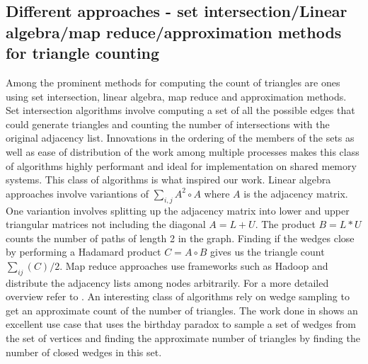 \subsection{Different approaches - set intersection/Linear algebra/map reduce/approximation methods for triangle counting}
Among the prominent methods for computing the count of triangles are ones using set intersection, linear algebra, map reduce and approximation methods. Set intersection algorithms \cite{b7} involve computing a set of all the possible edges that could generate triangles and counting the number of intersections with the original adjacency list. Innovations in the ordering of the members of the sets as well as ease of distribution of the work among multiple processes makes this class of algorithms highly performant\cite{b8} and ideal for implementation on shared memory systems. This class of algorithms is what inspired our work. Linear algebra approaches involve variantions of $\sum_{i,j}A^2\circ A$ where $A$ is the adjacency matrix\cite{b6}. One variantion involves splitting up the adjacency matrix into lower and upper triangular matrices not including the diagonal $A = L + U$. The product $B = L*U$ counts the number of paths of length 2 in the graph. Finding if the wedges close by performing a Hadamard product $C= A\circ B$ gives us the triangle count $\sum_{ij}(C)/2$\cite{b10, b9}. Map reduce approaches use frameworks such as Hadoop and distribute the adjacency lists among nodes arbitrarily. For a more detailed overview refer to \cite{b11,b12}. An interesting class of algorithms rely on wedge sampling to get an approximate count of the number of triangles. The work done in \cite{b13} shows an excellent use case that uses the birthday paradox to sample a set of wedges from the set of vertices and finding the approximate number of triangles by finding the number of closed wedges in this set.


